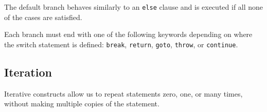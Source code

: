 \documentclass{article}
\begin{document}
The default branch behaves similarly to an \lstinline!else! clause and is executed if all 
none of the cases are satisfied.

Each branch must end with one of the following keywords depending on where the 
switch statement is defined: \lstinline!break!, \lstinline!return!, 
\lstinline!goto!, \lstinline!throw!, or \lstinline!continue!.
\subsection{Iteration}
Iterative constructs allow us to repeat statements zero, one, or many times,
without making multiple copies of the statement.
\end{document}

